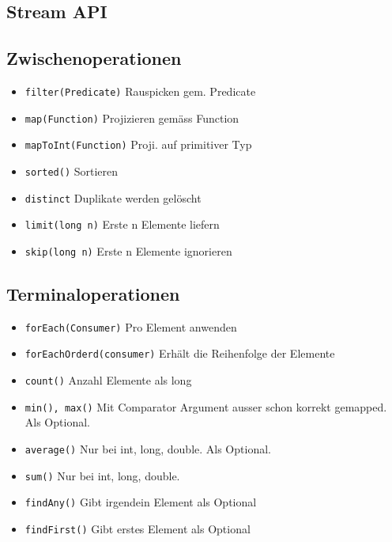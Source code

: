 \begin{multicols*}{5}
\section{Stream API}
	\subsection{Zwischenoperationen}
		\begin{itemize}
			\item \tiny \textcolor{b}{\texttt{filter(Predicate)}}
				\footnotesize Rauspicken gem. Predicate
			\item \tiny \textcolor{b}{\texttt{map(Function)}}
				\footnotesize Projizieren gemäss Function
			\item \tiny \textcolor{b}{\texttt{mapToInt(Function)}}
				\footnotesize Proji. auf primitiver Typ
			\item \tiny \textcolor{b}{\texttt{sorted()}}
				\footnotesize Sortieren
			\item \tiny \textcolor{b}{\texttt{distinct}}
				\footnotesize Duplikate werden gelöscht
			\item \tiny \textcolor{b}{\texttt{limit(long n)}}
				\footnotesize Erste n Elemente liefern
			\item \tiny \textcolor{b}{\texttt{skip(long n)}}
				\footnotesize Erste n Elemente ignorieren
		\end{itemize}
	\subsection{Terminaloperationen}
		\begin{itemize}
			\item \tiny \textcolor{b}{\texttt{forEach(Consumer)}}
				\footnotesize Pro Element anwenden
			\item \tiny \textcolor{b}{\texttt{forEachOrderd(consumer)}}
				\footnotesize Erhält die Reihenfolge der Elemente
			\item \tiny \textcolor{b}{\texttt{count()}}
				\footnotesize Anzahl Elemente als long
			\item \tiny \textcolor{b}{\texttt{min(), max()}}
				\footnotesize Mit Comparator Argument ausser schon korrekt gemapped. Als Optional.
			\item \tiny \textcolor{b}{\texttt{average()}}
				\footnotesize Nur bei int, long, double. Als Optional.
			\item \tiny \textcolor{b}{\texttt{sum()}}
				\footnotesize Nur bei int, long, double.
			\item \tiny \textcolor{b}{\texttt{findAny()}}
				\footnotesize Gibt irgendein Element als Optional
			\item \tiny \textcolor{b}{\texttt{findFirst()}}
				\footnotesize Gibt erstes Element als Optional
		\end{itemize}

\end{multicols*}
